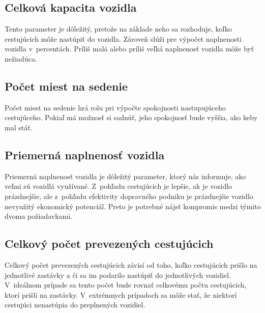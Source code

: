 \subsection*{Celková kapacita vozidla}
Tento parameter je dôležitý, pretože na základe neho sa rozhoduje, koľko cestujúcich môže nastúpiť do vozidla.
Zároveň slúži pre výpočet naplnenosti vozidla v~percentách.
Príliš malá alebo príliš veľká naplnenosť vozidla môže byť nežiadúca.

\subsection*{Počet miest na sedenie}
Počet miest na sedenie hrá rolu pri výpočte spokojnosti nastupujúceho cestujúceho.
Pokiaľ má možnosť si sadnúť, jeho spokojnosť bude vyššia, ako keby mal stáť.

\subsection*{Priemerná naplnenosť vozidla}
Priemerná naplnenosť vozidla je dôležitý parameter, ktorý nás informuje, ako veľmi sú vozidlá využívané.
Z~pohľadu cestujúcich je lepšie, ak je vozidlo prázdnejšie, ale z~pohľadu efektivity dopravného podniku je prázdnejšie vozidlo nevyužitý ekonomický potenciál.
Preto je potrebné nájsť kompromis medzi týmito dvoma požiadavkami.

\subsection*{Celkový počet prevezených cestujúcich}
Celkový počet prevezených cestujúcich závisí od toho, koľko cestujúcich prišlo na jednotlivé zastávky a či sa im podarilo nastúpiť do jednotlivých vozidiel.
V~ideálnom prípade sa tento počet bude rovnať celkovému počtu cestujúcich, ktorí prišli na zastávky.
V~extrémnych prípadoch sa môže stať, že niektorí cestujúci nenastúpia do preplnených vozidiel.

